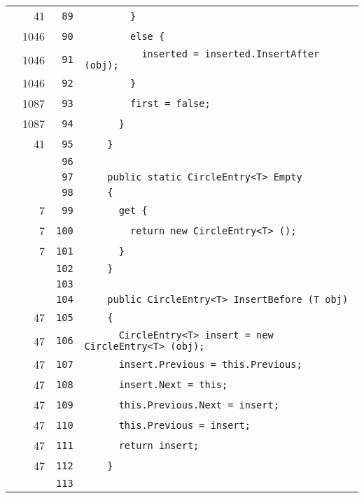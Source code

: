 \documentclass[a4paper,10pt]{article}
\begin{document}
\begin{longtable}[l]{lrrl}
\cellcolor{green} & 41 & \verb~89~ & \verb~        }~\\
\cellcolor{green} & 1046 & \verb~90~ & \verb~        else {~\\
\cellcolor{green} & 1046 & \verb~91~ & \verb~          inserted = inserted.InsertAfter (obj);~\\
\cellcolor{green} & 1046 & \verb~92~ & \verb~        }~\\
\cellcolor{green} & 1087 & \verb~93~ & \verb~        first = false;~\\
\cellcolor{green} & 1087 & \verb~94~ & \verb~      }~\\
\cellcolor{green} & 41 & \verb~95~ & \verb~    }~\\
\cellcolor{gray} &  & \verb~96~ & \verb~~\\
\cellcolor{gray} &  & \verb~97~ & \verb~    public static CircleEntry<T> Empty~\\
\cellcolor{gray} &  & \verb~98~ & \verb~    {~\\
\cellcolor{green} & 7 & \verb~99~ & \verb~      get {~\\
\cellcolor{green} & 7 & \verb~100~ & \verb~        return new CircleEntry<T> ();~\\
\cellcolor{green} & 7 & \verb~101~ & \verb~      }~\\
\cellcolor{gray} &  & \verb~102~ & \verb~    }~\\
\cellcolor{gray} &  & \verb~103~ & \verb~~\\
\cellcolor{gray} &  & \verb~104~ & \verb~    public CircleEntry<T> InsertBefore (T obj)~\\
\cellcolor{green} & 47 & \verb~105~ & \verb~    {~\\
\cellcolor{green} & 47 & \verb~106~ & \verb~      CircleEntry<T> insert = new CircleEntry<T> (obj);~\\
\cellcolor{green} & 47 & \verb~107~ & \verb~      insert.Previous = this.Previous;~\\
\cellcolor{green} & 47 & \verb~108~ & \verb~      insert.Next = this;~\\
\cellcolor{green} & 47 & \verb~109~ & \verb~      this.Previous.Next = insert;~\\
\cellcolor{green} & 47 & \verb~110~ & \verb~      this.Previous = insert;~\\
\cellcolor{green} & 47 & \verb~111~ & \verb~      return insert;~\\
\cellcolor{green} & 47 & \verb~112~ & \verb~    }~\\
\cellcolor{gray} &  & \verb~113~ & \verb~~\\

\end{longtable}
\end{document}
